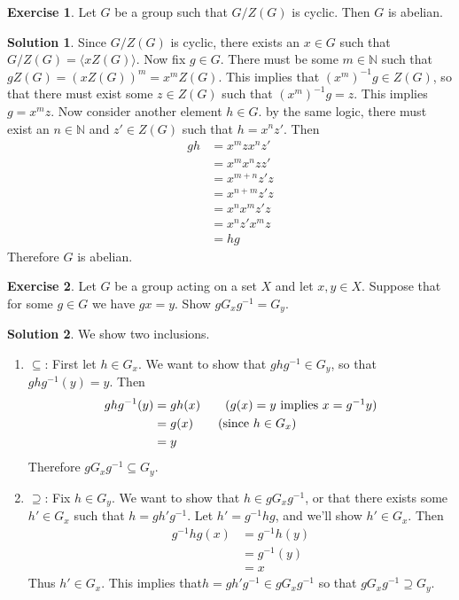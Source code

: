 \documentclass[12pt]{article}
\theoremstyle{definition}
\newtheorem{exercise}{\color{YellowOrange}Exercise}
\theoremstyle{definition}
\newtheorem{solution}{\color{Goldenrod}Solution}
\begin{document}
\begin{exercise}
	Let $G$ be a group such that $G/Z(G)$ is cyclic. Then $G$ is abelian.
\end{exercise}
\begin{solution}
	Since $G/Z(G)$ is cyclic, there exists an $x \in G$ such that $G/Z(G) = \langle x Z(G) \rangle$. Now fix $g \in G$. There must be some $m \in \mathbb{N}$ such that $gZ(G) = (xZ(G))^m = x^m Z(G)$. This implies that $(x^m)^{-1} g \in Z(G)$, so that there must exist some $z \in Z(G)$ such that $(x^m)^{-1} g = z$. This implies $g = x^m z$. Now consider another element $h \in G$. by the same logic, there must exist an $n \in \mathbb{N}$ and $z' \in Z(G)$ such that $h = x^n z'$. Then
	\begin{align*}
	gh &= x^m z x^n z' \\
	&= x^m x^n z z' \tag{since $z \in Z(G)$} \\
	&= x^{m + n} z' z \tag{combine powers and $z' \in Z(G)$} \\
	&= x^{n + m} z' z \\
	&= x^n x^m z' z \\
	&= x^n z' x^m z \\
	&= hg 
	\end{align*}
	Therefore $G$ is abelian. 
\end{solution}

\begin{exercise}
	Let $G$ be a group acting on a set $X$ and let $x,y \in X$. Suppose that for some $g \in G$ we have $gx = y$. Show $gG_xg^{-1} = G_y$.
\end{exercise}
\begin{solution}
	We show two inclusions.
	\begin{enumerate}
		\item $\subseteq$: First let $h \in G_x$. We want to show that $ghg^{-1} \in G_y$, so that $ghg^{-1}(y) = y$.  Then
		\begin{align*}
			ghg^{-1}(y) &= gh(x) \tag{$g(x) = y$ implies $x = g^{-1}y$} \\
			&= g(x) \tag{since $h \in G_x$} \\
			&= y 
		\end{align*}
		Therefore $gG_xg^{-1} \subseteq G_y$.
		\item $\supseteq$: Fix $h \in G_y$. We want to show that $h \in gG_xg^{-1}$, or that there exists some $h' \in G_x$ such that $h = gh'g^{-1}$. Let $h' = g^{-1}hg$, and we'll show $h' \in G_x$. Then
		\begin{align*}
			g^{-1}hg(x) &= g^{-1}h(y) \\
			&= g^{-1}(y) \tag{since $h \in G_y$} \\
			&= x
		\end{align*}
		Thus $h' \in G_x$. This implies that$h = gh'g^{-1} \in gG_xg^{-1}$ so that $gG_xg^{-1} \supseteq G_y$. 
	\end{enumerate}
\end{solution}
\end{document}
